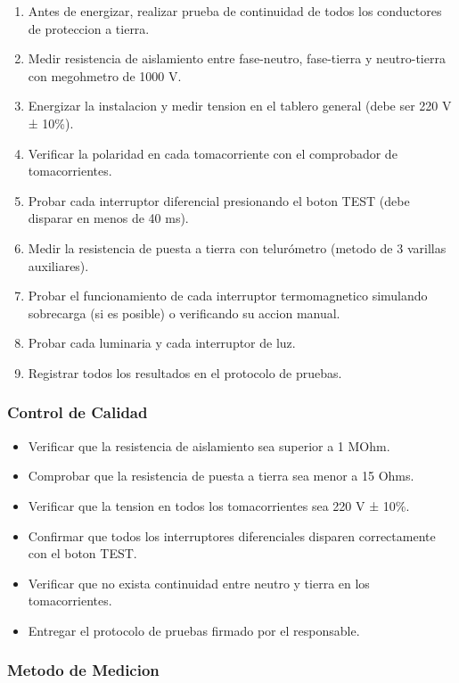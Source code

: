 \begin{enumerate}
  \item Antes de energizar, realizar prueba de continuidad de todos los conductores de proteccion a tierra.
  \item Medir resistencia de aislamiento entre fase-neutro, fase-tierra y neutro-tierra con megohmetro de 1000 V.
  \item Energizar la instalacion y medir tension en el tablero general (debe ser 220 V ± 10\%).
  \item Verificar la polaridad en cada tomacorriente con el comprobador de tomacorrientes.
  \item Probar cada interruptor diferencial presionando el boton TEST (debe disparar en menos de 40 ms).
  \item Medir la resistencia de puesta a tierra con telurómetro (metodo de 3 varillas auxiliares).
  \item Probar el funcionamiento de cada interruptor termomagnetico simulando sobrecarga (si es posible) o verificando su accion manual.
  \item Probar cada luminaria y cada interruptor de luz.
  \item Registrar todos los resultados en el protocolo de pruebas.
\end{enumerate}

\subsubsection{Control de Calidad}

\begin{itemize}
  \item Verificar que la resistencia de aislamiento sea superior a 1 MOhm.
  \item Comprobar que la resistencia de puesta a tierra sea menor a 15 Ohms.
  \item Verificar que la tension en todos los tomacorrientes sea 220 V ± 10\%.
  \item Confirmar que todos los interruptores diferenciales disparen correctamente con el boton TEST.
  \item Verificar que no exista continuidad entre neutro y tierra en los tomacorrientes.
  \item Entregar el protocolo de pruebas firmado por el responsable.
\end{itemize}

\subsubsection{Metodo de Medicion}

